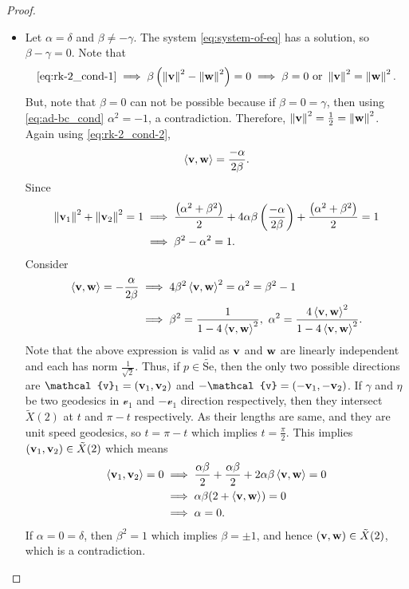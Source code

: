 \begin{proof}
	\begin{itemize}
		\item Let $\alpha=\delta$ and $\beta\neq -\gamma$. The system \eqref{eq:system-of-eq} has a solution, so $\beta-\gamma=0$. Note that 
		\begin{align*}
			\eqref{eq:rk-2_cond-1}  \implies \beta \left(\left\|\mathbf{v}\right\|^2-\left\|\mathbf{w}\right\|^2\right)= 0  \implies \beta=0 \text{ or } \left\|\mathbf{v}\right\|^2=\left\|\mathbf{w}\right\|^2. 
		\end{align*}
		But, note that $\beta=0$ can not be possible because if $\beta=0=\gamma$, then using \eqref{eq:ad-bc_cond} $\alpha^2=-1$, a contradiction. Therefore, $\left\|\mathbf{v}\right\|^2=\frac{1}{2}=\left\|\mathbf{w}\right\|^2$. Again using \eqref{eq:rk-2_cond-2}, 
		\begin{align*}
			\left\langle \mathbf{v},\mathbf{w} \right\rangle= \frac{-\alpha}{2\beta}. 
		\end{align*}
		Since
		\begin{align*}
			\left\|\mathbf{v}_1\right\|^2+\left\|\mathbf{v}_2\right\|^2 = 1 & \implies  \frac{\left(\alpha^2+\beta^2\right)}{2} +4\alpha \beta \left(\frac{-\alpha}{2\beta}\right)+ \frac{\left(\alpha^2+\beta^2\right)}{2}=1 \\ 
			& \implies \beta^2-\alpha^2=1.
		\end{align*}
		Consider 
		\begin{align*}
			\left\langle \mathbf{v},\mathbf{w} \right\rangle = -\frac{\alpha}{2 \beta} & \implies 4\beta^2\left\langle \mathbf{v},\mathbf{w} \right\rangle^2 = \alpha^2 = \beta^2-1 
			\\
			& \implies \beta^2 = \frac{1}{1-4 \left\langle \mathbf{v},\mathbf{w} \right\rangle^2},~\alpha^2 = \frac{4 \left\langle \mathbf{v},\mathbf{w} \right\rangle^2}{1-4 \left\langle \mathbf{v},\mathbf{w} \right\rangle^2}. 
		\end{align*}
		Note that the above expression is valid as $\mathbf{v}$ and $\mathbf{w}$ are linearly independent and each has norm $\frac{1}{\sqrt{2}}$. Thus, if $p\in \widetilde{\mathrm{Se}}$, then the only two possible directions are $\mathcal{v}_1=(\vbf_1,\vbf_2)$ and $-\mathcal{v}=(-\vbf_1,-\vbf_2)$. If $\gamma$ and $\eta$ be two geodesics in $\mathcal{v}_1$ and $-\mathcal{v}_1$ direction respectively, then they intersect $\tilde{X}(2)$ at $t$ and $\pi-t$ respectively. As their lengths are same, and they are unit speed geodesics, so $t=\pi-t$ which implies $t=\frac{\pi}{2}$. This implies $\left(\mathbf{v}_1,\mathbf{v}_2\right)\in \tilde{X}(2)$ which means 
		\begin{align*}
			\left\langle \mathbf{v}_1,\mathbf{v}_2 \right\rangle= 0 & \implies \frac{\alpha \beta}{2}  + \frac{\alpha \beta}{2} + 2\alpha \beta \left\langle \mathbf{v},\mathbf{w} \right\rangle = 0 \\ 
			& \implies \alpha \beta(2+\left\langle \mathbf{v},\mathbf{w} \right\rangle) = 0 \\
			& \implies \alpha = 0. 
		\end{align*}
	If $\alpha=0=\delta$, then $\beta^2=1$ which implies $\beta=\pm 1$, and hence $(\mathbf{v},\mathbf{w})\in \tilde{X}(2)$, which is a contradiction.


\end{itemize}
\end{proof}
